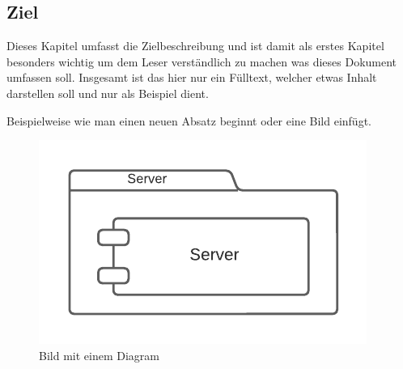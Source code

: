\subsection{Ziel} \label{sec:goal}

Dieses Kapitel umfasst die Zielbeschreibung und ist damit als erstes Kapitel besonders wichtig um dem Leser verständlich zu machen was dieses Dokument umfassen soll.
Insgesamt ist das hier nur ein Fülltext, welcher etwas Inhalt darstellen soll und nur als Beispiel dient.

Beispielweise wie man einen neuen Absatz beginnt oder eine Bild einfügt.

\begin{figure}[htb]
    \centering
    \includegraphics[scale=.65,center]{medien/diagrams/server}
    \caption{Bild mit einem Diagram}
    \ownsource
    \label{fig:server-diagram}
\end{figure}

